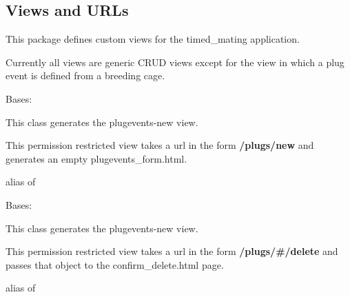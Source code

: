 \documentclass[letterpaper,10pt,english]{sphinxmanual}
\begin{document}
\subsection{Views and URLs}
\label{api:id10}\label{api:module-mousedb.timed_mating.views}
This package defines custom views for the timed\_mating application.

Currently all views are generic CRUD views except for the view in which a plug event is defined from a breeding cage.


\begin{fulllineitems}
\label{api:mousedb.timed_mating.views.PlugEventsCreate}
Bases: {\hyperref[api:mousedb.views.RestrictedCreateView]{}}

This class generates the plugevents-new view.

This permission restricted view takes a url in the form \textbf{/plugs/new} and generates an empty plugevents\_form.html.


\begin{fulllineitems}
\label{api:mousedb.timed_mating.views.PlugEventsCreate.model}
alias of 

\end{fulllineitems}


\end{fulllineitems}



\begin{fulllineitems}
\label{api:mousedb.timed_mating.views.PlugEventsDelete}
Bases: {\hyperref[api:mousedb.views.RestrictedDeleteView]{}}

This class generates the plugevents-new view.

This permission restricted view takes a url in the form \textbf{/plugs/\#/delete} and passes that object to the confirm\_delete.html page.


\begin{fulllineitems}
\label{api:mousedb.timed_mating.views.PlugEventsDelete.model}
alias of 

\end{fulllineitems}


\end{fulllineitems}
\end{document}
